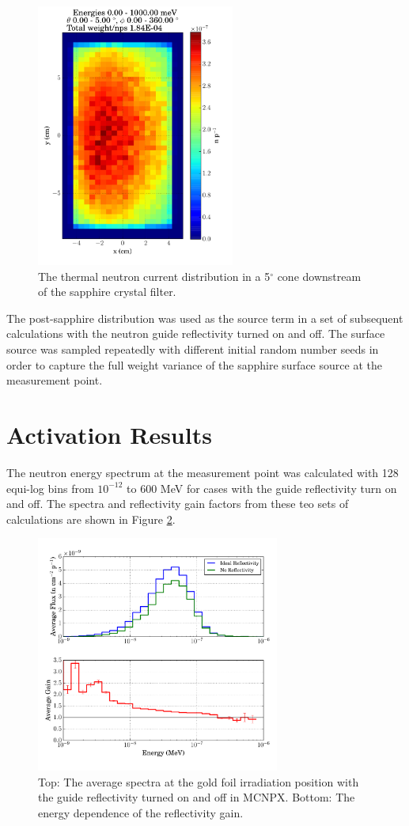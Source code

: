 \documentclass[a4paper,
              ]{jacow}
\begin{document}
\begin{figure}[!htb]
   \centering
   \includegraphics*[trim = 0mm 8mm 0mm 2.5mm, width=65mm]{graphics/sappdist.pdf}
   \caption{The thermal neutron current distribution in a 5$^\circ$ cone downstream of the sapphire crystal filter.}
   \label{sappdist}
\end{figure}

The post-sapphire distribution was used as the source term in a set of subsequent calculations with the neutron guide reflectivity turned on and off.  The surface source was sampled repeatedly with different initial random number seeds in order to capture the full weight variance of the sapphire surface source at the measurement point.

\section{Activation Results}

The neutron energy spectrum at the measurement point was calculated with 128 equi-log bins from $10^{-12}$ to 600 MeV for cases with the guide reflectivity turn on and off.  The spectra and reflectivity gain factors from these teo sets of calculations are shown in Figure \ref{gain}.  

\begin{figure}[!htb]
   \centering
   \includegraphics*[trim = 0mm 5mm 0mm 5mm, width=80mm]{graphics/gain.pdf}
   \caption{Top: The average spectra at the gold foil irradiation position with the guide reflectivity turned on and off in MCNPX.  Bottom: The energy dependence of the reflectivity gain.}
   \label{gain}
\end{figure}
\end{document}
